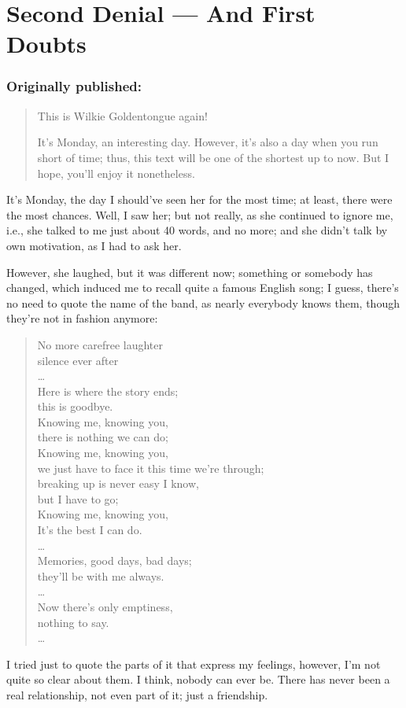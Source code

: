 \chapter{Second Denial --- And First Doubts}
\label{cha:second-denial-first-doubts}
\subsection*{Originally published: }
\begin{quote}
This is Wilkie Goldentongue again!

It's Monday, an interesting day. However, it's also a day when you run short of time; thus, this text will be one of the shortest up to now. But I hope, you'll enjoy it nonetheless. 
\end{quote}

It's Monday, the day I should've seen her for the most time; at least, there were the most chances. Well, I saw her; but not really, as she continued to ignore me, i.e., she talked to me just about 40 words, and no more; and she didn't talk by own motivation, as I had to ask her.

However, she laughed, but it was different now; something or somebody has changed, which induced me to recall quite a famous English song; I guess, there's no need to quote the name of the band, as nearly everybody knows them, though they're not in fashion anymore:
\begin{verse}
No more carefree laughter\\
silence ever after\\
\ldots\\
Here is where the story ends;\\
this is goodbye.\\
Knowing me, knowing you,\\
there is nothing we can do; \\
Knowing me, knowing you, \\
we just have to face it this time we're through;\\
breaking up is never easy I know,\\
but I have to go;\\
Knowing me, knowing you,\\
It's the best I can do. \\
\ldots\\
Memories, good days, bad days;\\
they'll be with me always. \\
\ldots\\
Now there's only emptiness,\\
nothing to say.\\
\ldots
\end{verse}
I tried just to quote the parts of it that express my feelings, however, I'm not quite so clear about them. I think, nobody can ever be. There has never been a real relationship, not even part of it; just a friendship.

